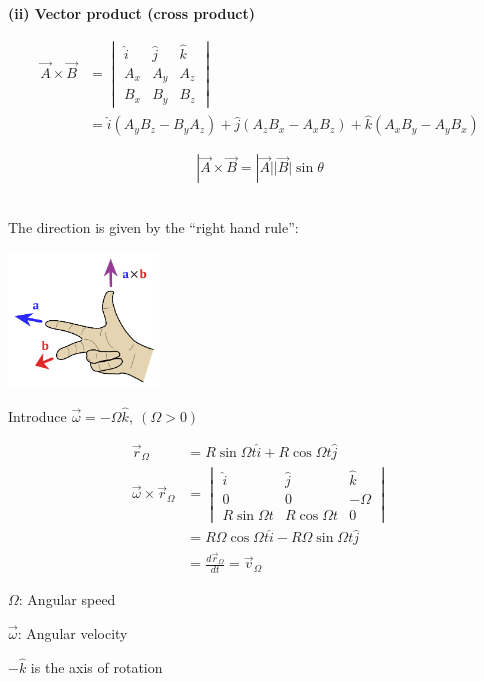 \documentclass[10pt]{scrartcl}
\begin{document}
\textbf{(ii) Vector product (cross product)}

\[\begin{aligned}
\vec{A}\times \vec{B} &= \begin{vmatrix}
 \hat{i} & \hat{j} & \hat{k} \\
 A_x & A_y & A_z\\
 B_x & B_y & B_z	
 \end{vmatrix}\\
&= \hat{i}(A_yB_z - B_yA_z) + \hat{j}(A_zB_x - A_xB_z) + \hat{k}(A_xB_y - A_yB_x)
\end{aligned}
\]	

\begin{center}
  \end{center}
  \[|\vec{A} \times \vec{B} = |\vec{A}||\vec{B}|\sin\theta\]~
  
  The direction is given by the ``right hand rule'':
  \begin{center}
  \includegraphics[width = 4cm]{right.png}	
  \end{center}

  
  \begin{example}
  Introduce $\vec{\omega} = -\Omega\hat{k},~(\Omega > 0)$
  
  \[
  \begin{aligned}
  \vec{r}_\Omega &= R\sin\Omega t\hat{i} + R\cos\Omega t\hat{j}\\
  \vec{\omega} \times \vec{r}_\Omega &= 
  \begin{vmatrix}
 \hat{i} & \hat{j} & \hat{k} \\
 0 & 0 & -\Omega \\
 R\sin\Omega t & R\cos\Omega t & 0 	
 \end{vmatrix}\\
 &= R\Omega \cos\Omega t\hat{i} -R\Omega \sin\Omega t\hat{j}\\
 &= \frac{d\vec{r}_\Omega}{dt} = \vec{v}_\Omega 
  \end{aligned}
  \]	
 

 $\Omega$: Angular speed
 
 $\vec{\omega}$: Angular velocity
 
 $-\hat{k}$ is the axis of rotation
  \end{example}
  
\end{document}
